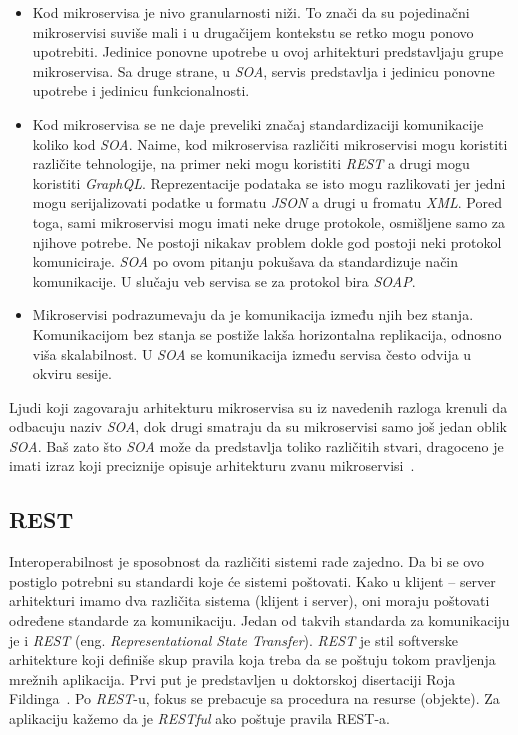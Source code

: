 \begin{itemize}
    \item Kod mikroservisa je nivo granularnosti niži. To znači da su pojedinačni mikroservisi suviše mali i u drugačijem 
    kontekstu se retko mogu ponovo upotrebiti. Jedinice ponovne upotrebe u ovoj arhitekturi predstavljaju grupe mikroservisa.
    Sa druge strane, u \textit{SOA}, servis predstavlja i jedinicu ponovne upotrebe i jedinicu funkcionalnosti.
    \item Kod mikroservisa se ne daje preveliki značaj standardizaciji komunikacije koliko kod \textit{SOA}. Naime, kod mikroservisa
    različiti mikroservisi mogu koristiti različite tehnologije, na primer neki mogu koristiti \textit{REST} a drugi mogu koristiti \textit{GraphQL}.
    Reprezentacije podataka se isto mogu razlikovati jer jedni mogu serijalizovati podatke u formatu \textit{JSON} a drugi u fromatu \textit{XML}.
    Pored toga, sami mikroservisi mogu imati neke druge protokole, osmišljene samo za njihove potrebe. 
    Ne postoji nikakav problem dokle god postoji neki protokol komuniciraje. %
    \textit{SOA} po ovom pitanju pokušava da standardizuje način komunikacije. U slučaju veb servisa se za protokol bira \textit{SOAP}.
    \item Mikroservisi podrazumevaju da je komunikacija između njih bez stanja. Komunikacijom bez stanja se postiže lakša horizontalna replikacija, odnosno 
    viša skalabilnost. U \textit{SOA} se komunikacija između servisa često odvija u okviru sesije.
\end{itemize}		

Ljudi koji zagovaraju arhitekturu mikroservisa su iz navedenih razloga krenuli da odbacuju naziv \textit{SOA}, 
dok drugi smatraju da su mikroservisi samo još jedan oblik \textit{SOA}. Baš zato što \textit{SOA} 
može da predstavlja toliko različitih stvari, dragoceno je imati izraz koji preciznije opisuje arhitekturu 
zvanu mikroservisi~\cite{martinfowler_microservices}.

\subsection{REST}\label{sec:arhitektura-rest}

Interoperabilnost je sposobnost da različiti sistemi rade zajedno. Da bi se ovo postiglo potrebni su 
standardi koje će sistemi poštovati. Kako u klijent -- server arhitekturi imamo dva različita sistema 
(klijent i server), oni moraju poštovati određene standarde za komunikaciju. Jedan od takvih standarda za 
komunikaciju je i \textit{REST} (eng. \textit{Representational State Transfer}). \textit{REST} je stil 
softverske arhitekture koji definiše skup pravila koja treba da se poštuju tokom pravljenja mrežnih 
aplikacija. Prvi put je predstavljen u doktorskoj disertaciji Roja Fildinga~\cite{REST_Roy}. Po \textit{REST}-u, 
fokus se prebacuje sa procedura na resurse (objekte). Za aplikaciju kažemo da je \textit{RESTful} ako poštuje pravila REST-a.


